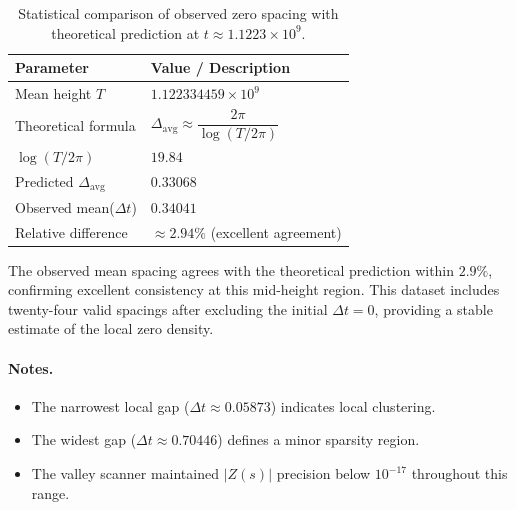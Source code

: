 \documentclass[11pt,a4paper]{article}
\begin{document}
\begin{table}[H]
\centering
\caption{Statistical comparison of observed zero spacing with theoretical prediction at $t \approx 1.1223\times10^{9}$.}
\begin{tabular}{ll}
\hline
\textbf{Parameter} & \textbf{Value / Description} \\
\hline
Mean height $T$ & $1.122334459\times10^{9}$ \\
Theoretical formula & $\Delta_{\mathrm{avg}} \approx \dfrac{2\pi}{\log(T / 2\pi)}$ \\
$\log(T / 2\pi)$ & $19.84$ \\
Predicted $\Delta_{\mathrm{avg}}$ & $0.33068$ \\
Observed mean($\Delta t$) & $0.34041$ \\
Relative difference & $\approx 2.94\%$ (excellent agreement) \\
\hline
\end{tabular}
\label{tab:spacing_comparison_1122334455}
\end{table}

\noindent
The observed mean spacing agrees with the theoretical prediction within $2.9\%$, confirming excellent consistency at this mid-height region. This dataset includes twenty-four valid spacings after excluding the initial $\Delta t=0$, providing a stable estimate of the local zero density.

\paragraph{Notes.}
\begin{itemize}
\item The narrowest local gap ($\Delta t \approx 0.05873$) indicates local clustering.
\item The widest gap ($\Delta t \approx 0.70446$) defines a minor sparsity region.
\item The valley scanner maintained $|Z(s)|$ precision below $10^{-17}$ throughout this range.
\end{itemize}

\end{document}
